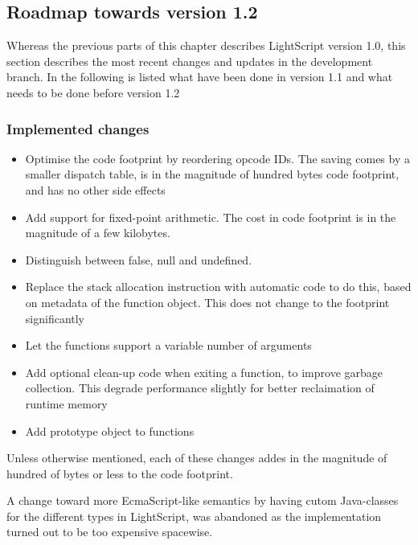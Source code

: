 \documentclass[11pt]{report}
\begin{document}
\subsection{Roadmap towards version 1.2}
Whereas the previous parts of this chapter describes LightScript version 1.0, this section describes the most recent changes and updates in the development branch.
In the following is listed what have been done in version 1.1 and what needs to be done before version 1.2
\subsubsection{Implemented changes}
\begin{itemize}
\item Optimise the code footprint by reordering opcode IDs. The saving comes by a smaller dispatch table, is in the magnitude of hundred bytes code footprint, and has no other side effects
\item Add support for fixed-point arithmetic. The cost in code footprint is in the magnitude of a few kilobytes.
\item Distinguish between false, null and undefined.
\item Replace the stack allocation instruction with automatic code to do this, based on metadata of the function object. This does not change to the footprint significantly
\item Let the functions support a variable number of arguments
\item Add optional clean-up code when exiting a function, to improve garbage collection. This degrade performance slightly for better reclaimation of runtime memory
\item Add prototype object to functions
\end{itemize}
Unless otherwise mentioned, each of these changes addes in the magnitude of hundred of bytes or less to the code footprint.

A change toward more EcmaScript-like semantics by having cutom Java-classes for the different types in LightScript, was abandoned as the implementation turned out to be too expensive spacewise.
\end{document}
